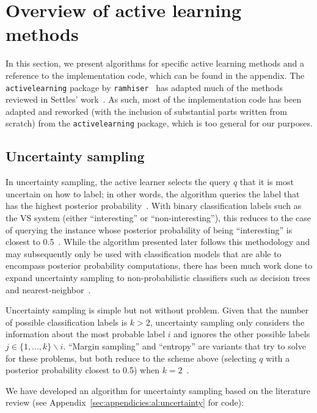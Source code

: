 \section{Overview of active learning methods}
\label{sec:al:methods}

In this section, we present algorithms for specific active learning methods and 
a reference to the implementation code, which can be found in the appendix. The 
\texttt{activelearning} package by \texttt{ramhiser}~\cite{ramhiser2015} has 
adapted much of the methods reviewed in Settles' work~\cite{settles2010}. As 
such, most of the implementation code has been adapted and reworked (with the 
inclusion of substantial parts written from scratch) from the 
\texttt{activelearning} package, which is too general for our purposes.

\subsection{Uncertainty sampling}
\label{sec:al:methods:uncertainty} 

In uncertainty sampling, the active learner selects the query $q$ that it is 
most uncertain on how to label; in other words, the algorithm queries the label 
that has the highest posterior probability~\cite{lewis1994}. With binary 
classification labels such as the VS system (either ``interesting'' or 
``non-interesting''), this reduces to the case of querying the instance whose 
posterior probability of being ``interesting'' is closest to 
0.5~\cite{lewis1994}. While the algorithm presented later follows this 
methodology and may subsequently only be used with classification models that 
are able to encompass posterior probability computations, there has been much 
work done to expand uncertainty sampling to non-probabilistic classifiers such 
as decision trees and nearest-neighbor~\cite{settles2010}.

Uncertainty sampling is simple but not without problem. Given that the 
number of possible classification labels is $k > 2$, uncertainty sampling only 
considers the information about the most probable label $i$ and ignores the 
other possible labels $j \in \{1,...,k\}\backslash i$. ``Margin sampling'' and 
``entropy'' are variants that try to solve for these problems, but 
both reduce to the scheme above (selecting $q$ with a posterior probability 
closest to 0.5) when $k=2$~\cite{settles2010}.

We have developed an algorithm for uncertainty sampling based on the literature 
review (see Appendix~\ref{sec:appendicies:al:uncertainty} for code):

